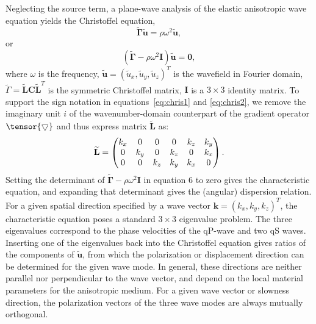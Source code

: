 Neglecting the source term, a plane-wave analysis of the elastic anisotropic wave equation yields the 
Christoffel equation,
\begin{equation}
\label{eq:chris1}
\widetilde{\mathbf{\Gamma}}\widetilde{\mathbf{u}} = \rho{\omega}^2\widetilde{\mathbf{u}},
\end{equation}
or
\begin{equation}
\label{eq:chris2}
(\widetilde{\mathbf{\Gamma}} - \rho{\omega}^2\mathbf{I})\widetilde{\mathbf{u}} = \mathbf{0},
\end{equation}
where $\omega$ is the frequency, $\widetilde{\mathbf{u}}=(\widetilde{u}_x,\widetilde{u}_y,\widetilde{u}_z)^{T}$
 is the wavefield in Fourier domain, $\widetilde{\Gamma} = \widetilde{\mathbf{L}}\mathbf{C}\widetilde{\mathbf{L}}^{T}$ 
is the symmetric Christoffel matrix, $\mathbf{I}$ is a $3\times3$ identity matrix.
To support the sign notation in equations~\ref{eq:chris1} and \ref{eq:chris2}, 
we remove the imaginary unit $i$ of the wavenumber-domain counterpart of the gradient operator
 $\tensor{\bigtriangledown}$ and thus express matrix $\widetilde{\mathbf{L}}$ as: 
\begin{equation}
\label{eq:wavenumber}
\widetilde{\mathbf{L}}=
\begin{pmatrix}k_x & 0 &0 &0 & k_z & k_y \cr
         0 & k_y & 0 & k_z &0 & k_x \cr
         0 & 0 & k_z & k_y & k_x &0\end{pmatrix}.
\end{equation}
Setting the determinant of 
$\widetilde{\mathbf{\Gamma}} - \rho{\omega}^2\mathbf{I}$ in equation 6 to zero gives the
 characteristic equation, and expanding that determinant gives the (angular) dispersion relation. For a given
 spatial direction specified by a wave vector $\mathbf{k} = (k_x, k_y, k_z)^{T}$, the characteristic equation
 poses a standard $3\times3$ eigenvalue problem. The three eigenvalues correspond to the phase velocities of
 the qP-wave and two qS waves. Inserting one of the eigenvalues back into the Christoffel equation gives
 ratios of the components of $\mathbf{\widetilde{u}}$, from which the polarization or displacement direction
 can be determined for the given wave mode. In general, these directions are neither parallel nor
 perpendicular to the wave vector, and depend on the local material parameters for the anisotropic
 medium. For a given wave vector or slowness direction, the polarization vectors of the three wave modes are
 always mutually orthogonal.

